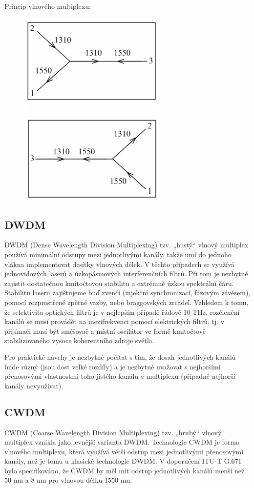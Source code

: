 Princip vlnového multiplexu:
\begin{figure}[!ht]
\begin{center}
    \includegraphics[scale=0.7]{obrazky/multiplex.png}
  \end{center}
\end{figure}
\subsection{DWDM}
DWDM (Dense Wavelength Division Multiplexing) tzv. „hustý“ vlnový multiplex používá minimální odstupy mezi jednotlivými kanály, takže umí do jednoho vlákna implementovat desítky vlnových délek. V těchto případech se využívá jednovidových laserů a úzkopásmových interferenčních filtrů. Při tom je nezbytné zajistit dostatečnou kmitočtovou stabilitu a extrémně úzkou spektrální čáru. Stabilitu laseru zajištujeme buď zvenčí (injekční synchronizací, fázovým závěsem), pomocí rozprostřené zpětné vazby, nebo braggovských zrcadel. Vzhledem k tomu, že selektivita optických filtrů je v nejlepším případě řádově 10 THz, rozčlenění kanálů se musí provádět na mezifrekvenci pomocí elektrických filtrů, tj. v přijímači musí být směšovač a místní oscilátor ve formě kmitočtově stabilizovaného vysoce koherentního zdroje světla.

Pro praktické návrhy je nezbytné počítat s tím, že dosah jednotlivých kanálů bude různý (jsou dost velké rozdíly) a je nezbytné uvažovat s nejhoršími přenosovými vlastnostmi toho jistého kanálu v multiplexu (případně nejhorší kanály nevyužívat). 

\subsection{CWDM}
CWDM (Coarse Wavelength Division Multiplexing) tzv. „hrubý“ vlnový multiplex vznikla jako levnější varianta DWDM. Technologie CWDM je forma vlnového multiplexu, která využívá větší odstup mezi jednotlivými přenosovými kanály, než je tomu u klasické technologie DWDM. V doporučení ITU-T G.671 bylo specifikováno, že CWDM by měl mít odstup jednotlivých kanálů menší než 50 nm a 8 nm pro vlnovou délku 1550 nm.

